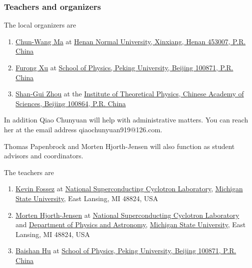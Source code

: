 \documentclass{beamer}
\begin{document}
\begin{frame}
\frametitle{Teachers and organizers}

\begin{block}{}
The local organizers are 

\begin{enumerate}
\item \href{{https://www.researchgate.net/profile/Chun-Wang_Ma}}{Chun-Wang Ma} at \href{{http://www.htu.cn/english/}}{Henan Normal University, Xinxiang, Henan 453007, P.R. China}

\item \href{{http://www.phy.pku.edu.cn/~frxu/}}{Furong Xu} at \href{{http://english.pku.edu.cn/}}{School of Physics, Peking University, Beijing 100871, P.R. China}

\item \href{{http://www.itp.ac.cn/~sgzhou/eindex.html}}{Shan-Gui Zhou} at  the \href{{http://www.cas.ac.cn/}}{Institute of Theoretical Physics, Chinese Academy of Sciences, Beijing 100864, P.R. China} 
\end{enumerate}

\noindent
In addition Qiao Chunyuan will help with administrative matters. You can reach her at the email address qiaochunyuan919@126.com.

Thomas Papenbrock and Morten Hjorth-Jensen  will also function as student advisors and coordinators.



The teachers are 
\begin{enumerate}
\item \href{{https://loop.frontiersin.org/people/519268/overview}}{Kevin Fossez} at \href{{http://www.nscl.msu.edu/}}{National Superconducting Cyclotron Laboratory},  \href{{http://www.msu.edu/}}{Michigan State University}, East Lansing, MI 48824, USA

\item \href{{http://mhjgit.github.io/info/doc/web/}}{Morten Hjorth-Jensen}  at \href{{http://www.nscl.msu.edu/}}{National Superconducting Cyclotron Laboratory} and \href{{https://www.pa.msu.edu/}}{Department of Physics and Astronomy}, \href{{http://www.msu.edu/}}{Michigan State University}, East Lansing, MI 48824, USA

\item \href{{http://www.phy.pku.edu.cn/~frxu/people.html}}{Baishan Hu} at \href{{http://english.pku.edu.cn/}}{School of Physics, Peking University, Beijing 100871, P.R. China}


\end{enumerate}
\end{block}
\end{frame}
\end{document}
